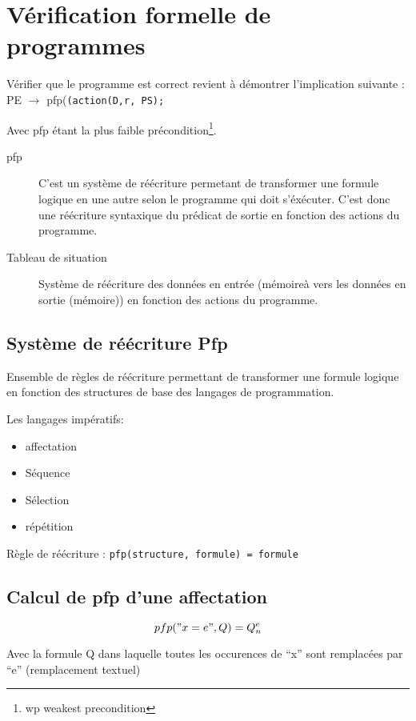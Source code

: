 
		\chapter{Vérification formelle de programmes}\label{pfp}
	Vérifier que le programme est correct revient à démontrer l'implication suivante :\\ PE $\rightarrow$ pfp(\texttt{(action(D,r, PS);}

	Avec pfp étant la plus faible précondition\footnote{wp weakest precondition}.
	\begin{description}
		\item[pfp]	C'est un système de réécriture permetant de transformer une formule logique en une autre selon le programme qui doit s'éxécuter.
			C'est donc une réécriture syntaxique du prédicat de sortie en fonction des actions du programme.  \item[Tableau de situation] Système de réécriture des données en entrée (mémoireà vers les données en sortie (mémoire)) en fonction des actions du programme.  \end{description}
	\section{Système de réécriture Pfp}
		Ensemble de règles de réécriture permettant de transformer une formule logique en fonction des structures de base des langages de programmation.

		Les langages impératifs:
			\begin{itemize}
				\item affectation
				\item Séquence
				\item Sélection
				\item répétition
			\end{itemize}

		Règle de réécriture : \texttt{pfp(structure, formule) = formule}

	\section{Calcul de pfp d'une affectation}
	$$pfp("x=e", Q) = Q^e_n$$

	Avec la formule Q dans laquelle toutes les occurences de ``x'' sont remplacées par ``e'' (remplacement textuel)
